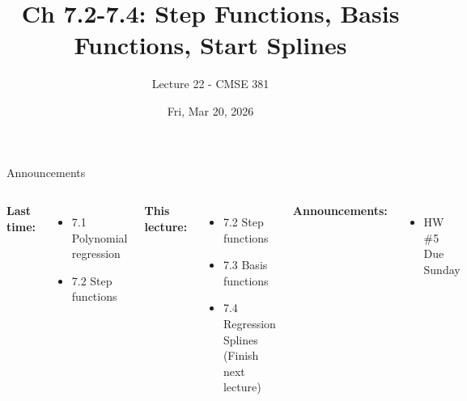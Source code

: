 \documentclass[aspectratio=169,usenames,dvipsnames]{beamer}
\newcommand{\InstructorNotes}[1]{\textit{\color{orange}#1}}
\begin{document}
\title[]{Ch 7.2-7.4: Step Functions, Basis Functions, Start Splines }
\subtitle{Lecture 22 - CMSE 381}
\date{Fri, Mar 20, 2026}




\begin{frame}
 \titlepage


\end{frame}
\begin{frame}[c]{Announcements}
\begin{columns}
\centering

	\textbf{Last time:}
	\begin{itemize}
	\item 7.1 Polynomial regression 
	\item 7.2 Step functions
	\end{itemize}

	\vspace{.2in}

	\textbf{This lecture:}
	\begin{itemize}
	\item 7.2 Step functions
	\item 7.3 Basis functions
	\item 7.4 Regression Splines (Finish next lecture)
\end{itemize}


\centering

\textbf{Announcements:}
	\begin{itemize}
		\item HW \#5 Due Sunday
	\end{itemize}
\end{columns}

\end{frame}
\end{document}
